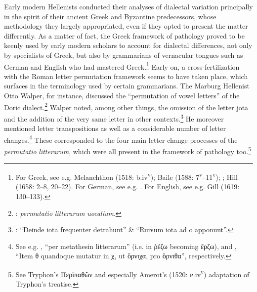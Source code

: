 Early modern Hellenists conducted their analyses of dialectal variation principally in the spirit of their ancient Greek and Byzantine predecessors, whose methodology they largely appropriated, even if they opted to present the matter differently. As a matter of fact, the Greek framework of pathology proved to be keenly used by early modern scholars to account for dialectal differences, not only by specialists of Greek, but also by grammarians of vernacular tongues such as German and English who had mastered Greek.\footnote{ \textrm{For Greek, see e.g. Melanchthon (1518: b.iv}\textrm{\textsc{\textsuperscript{v}}}\textrm{); Baile (1588: 7}\textrm{\textsc{\textsuperscript{v}}}\textrm{–11}\textrm{\textsc{\textsuperscript{v}}}\textrm{); \citet[11]{Schmidt1604}; Hill (1658: 2–8, 20–22). For German, see e.g. \citet{Wolf1578}. For English, see e.g. Gill (1619: 130–133).}} Early on, a cross-fertilization with the Roman letter permutation framework seems to have taken place, which surfaces in the terminology used by certain grammarians. The Marburg Hellenist Otto Walper, for instance, discussed the “permutation of vowel letters” of the Doric dialect.\footnote{ \textrm{\citet[62]{Walper1589}:} \textrm{\textit{permutatio} \textit{litterarum} \textit{uocalium}}.} Walper noted, among other things, the omission of the letter jota and the addition of the very same letter in other contexts.\footnote{ \textrm{\citet[63]{Walper1589}: “Deinde iota frequenter detrahunt” \& “Rursum iota ad o apponunt”.}} He moreover mentioned letter transpositions as well as a considerable number of letter changes.\footnote{ \textrm{See e.g. \citet[63]{Walper1589}, “per metathesin litterarum” (i.e. in ῥέζω becoming ἔρζω), and \citet[64]{Walper1589}, “Item θ quandoque mutatur in χ, ut ὄρνιχα, pro ὄρνιθα”, respectively.}} These corresponded to the four main letter change processes of the \textit{permutatio} \textit{litterarum}, which were all present in the framework of pathology too.\footnote{ \textrm{See Tryphon’s Περὶπαθῶν and especially Amerot’s (1520:} \textrm{\textsc{p.}}\textrm{iv}\textrm{\textsc{\textsuperscript{v}}}\textrm{)} \textrm{adaptation of Tryphon’s treatise.}}

